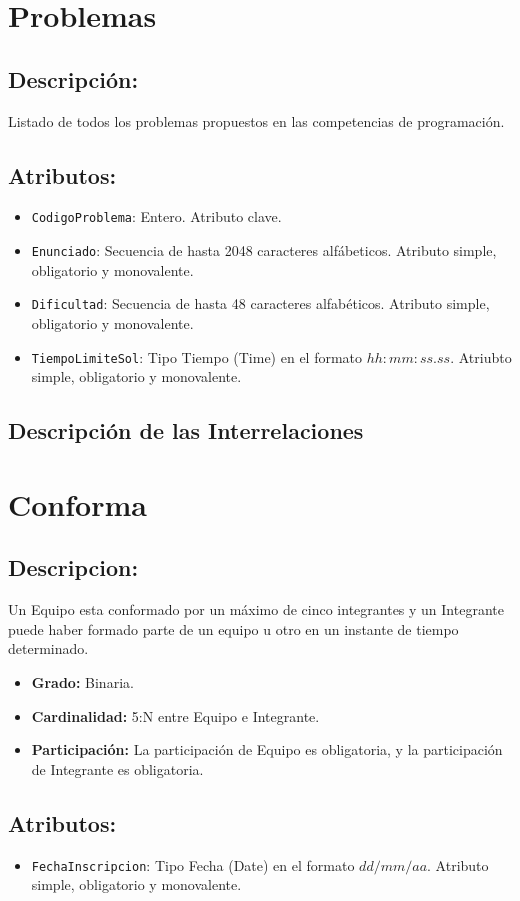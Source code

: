 \documentclass[doc, 12pt, donotrepeattitle]{apa6}
\begin{document}
\newpage
\section*{Problemas}
\subsection*{Descripción:}
Listado de todos los problemas propuestos en las competencias de programación.

\subsection*{Atributos:}
\begin{itemize}
\item \texttt{CodigoProblema}: Entero. Atributo clave.
\item \texttt{Enunciado}: Secuencia de hasta 2048 caracteres alfábeticos. Atributo simple, obligatorio y monovalente.
\item \texttt{Dificultad}: Secuencia de hasta 48 caracteres alfabéticos. Atributo simple, obligatorio y monovalente.
\item \texttt{TiempoLimiteSol}: Tipo Tiempo (Time) en el formato $hh:mm:ss.ss$. Atriubto simple, obligatorio y monovalente.
\end{itemize}

\newpage
\subsection*{Descripción de las Interrelaciones}
\section*{Conforma}
\subsection*{Descripcion:}
Un Equipo esta conformado por un máximo de cinco integrantes y un Integrante puede haber formado parte de un equipo u otro en un instante de tiempo determinado.
\begin{itemize}
\item \textbf{Grado:} Binaria.
\item \textbf{Cardinalidad:} 5:N entre Equipo e Integrante.
\item \textbf{Participación:} La participación de Equipo es obligatoria, y la participación de Integrante es obligatoria.
\end{itemize}
\subsection*{Atributos:}
\begin{itemize}
\item \texttt{FechaInscripcion}: Tipo Fecha (Date) en el formato $dd/mm/aa$. Atributo simple, obligatorio y monovalente.
\end{itemize}
\end{document}
